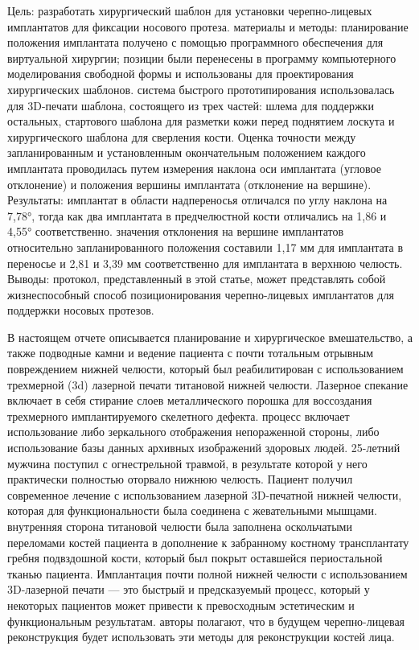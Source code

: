 Цель: разработать хирургический шаблон для установки черепно-лицевых имплантатов
для фиксации носового протеза. материалы и методы: планирование положения
имплантата получено с помощью программного обеспечения для виртуальной хирургии;
позиции были перенесены в программу компьютерного моделирования свободной формы
и использованы для проектирования хирургических шаблонов. система быстрого
прототипирования использовалась для 3D-печати шаблона, состоящего из трех
частей: шлема для поддержки остальных, стартового шаблона для разметки кожи
перед поднятием лоскута и хирургического шаблона для сверления кости. Оценка
точности между запланированным и установленным окончательным положением каждого
имплантата проводилась путем измерения наклона оси имплантата (угловое
отклонение) и положения вершины имплантата (отклонение на вершине). Результаты:
имплантат в области надпереносья отличался по углу наклона на 7,78°, тогда как
два имплантата в предчелюстной кости отличались на 1,86 и 4,55° соответственно.
значения отклонения на вершине имплантатов относительно запланированного
положения составили 1,17 мм для имплантата в переносье и 2,81 и 3,39 мм
соответственно для имплантата в верхнюю челюсть. Выводы: протокол,
представленный в этой статье, может представлять собой жизнеспособный способ
позиционирования черепно-лицевых имплантатов для поддержки носовых
протезов.\cite{ciocca2011}

В настоящем отчете описывается планирование и хирургическое вмешательство, а
также подводные камни и ведение пациента с почти тотальным отрывным повреждением
нижней челюсти, который был реабилитирован с использованием трехмерной (3d)
лазерной печати титановой нижней челюсти. Лазерное спекание включает в себя
стирание слоев металлического порошка для воссоздания трехмерного
имплантируемого скелетного дефекта. процесс включает использование либо
зеркального отображения непораженной стороны, либо использование базы данных
архивных изображений здоровых людей. 25-летний мужчина поступил с огнестрельной
травмой, в результате которой у него практически полностью оторвало нижнюю
челюсть. Пациент получил современное лечение с использованием лазерной
3D-печатной нижней челюсти, которая для функциональности была соединена с
жевательными мышцами. внутренняя сторона титановой челюсти была заполнена
оскольчатыми переломами костей пациента в дополнение к забранному костному
трансплантату гребня подвздошной кости, который был покрыт оставшейся
периостальной тканью пациента. Имплантация почти полной нижней челюсти с
использованием 3D-лазерной печати — это быстрый и предсказуемый процесс, который
у некоторых пациентов может привести к превосходным эстетическим и
функциональным результатам. авторы полагают, что в будущем черепно-лицевая
реконструкция будет использовать эти методы для реконструкции костей
лица.\cite{leiser2016}
